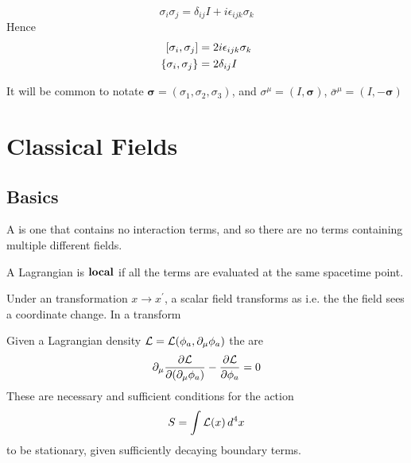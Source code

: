 \documentclass{article}
\begin{document}
\begin{fact}
\[
\sigma_i \sigma_j = \delta_{ij}I +i\epsilon_{ijk}\sigma_k
\]
Hence 
\begin{align*}
    \comm[\sigma_i]{\sigma_j} &= 2i\eps_{ijk}\sigma_k \\
    \acomm[\sigma_i]{\sigma_j} &= 2\delta_{ij}I
\end{align*}
\end{fact}

\begin{fact}
It will be common to notate $\bm{\sigma}=(\sigma_1, \sigma_2, \sigma_3)$, and $\sigma^\mu=(I,\bm{\sigma})$, $\bar{\sigma}^\mu=(I, -\bm{\sigma})$
\end{fact}
\section{Classical Fields}

\subsection{Basics}

\begin{definition}
A  is one that contains no interaction terms, and so there are no terms containing multiple different fields. 
\end{definition}

\begin{definition}
A Lagrangian is $\bam{local}$ if all the terms are evaluated at the same spacetime point. 
\end{definition}

\begin{definition}
Under an  transformation $x \to x^\prime$, a scalar field transforms as 
i.e. the the field sees a coordinate change. In a  transform 
\end{definition}

\begin{definition}
Given a Lagrangian density $\mathcal{L}=\mathcal{L}(\phi_a,\del_\mu \phi_a)$ the  are 
\[
\del_\mu \pd[\mc{L}]{(\del_\mu \phi_a)}-\pd[\mc{L}]{\phi_a}=0
\]
These are necessary and sufficient conditions for the action 
\[
S=\int \mc{L}(x) \, d^4x
\]
to be stationary, given sufficiently decaying boundary terms. 
\end{definition}
\end{document}
